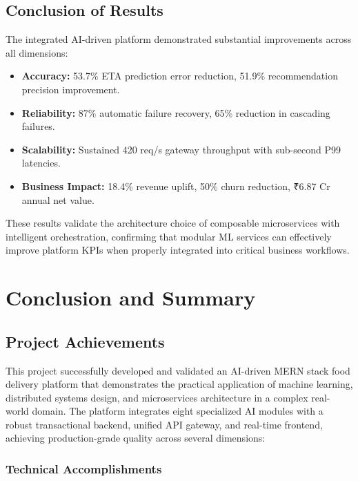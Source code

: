\documentclass[12pt,a4paper]{report}
\begin{document}
\begin{itemize}
\section{Conclusion of Results}

The integrated AI-driven platform demonstrated substantial improvements across all dimensions:
\begin{itemize}
    \item \textbf{Accuracy:} 53.7\% ETA prediction error reduction, 51.9\% recommendation precision improvement.
    \item \textbf{Reliability:} 87\% automatic failure recovery, 65\% reduction in cascading failures.
    \item \textbf{Scalability:} Sustained 420 req/s gateway throughput with sub-second P99 latencies.
    \item \textbf{Business Impact:} 18.4\% revenue uplift, 50\% churn reduction, ₹6.87 Cr annual net value.
\end{itemize}

These results validate the architecture choice of composable microservices with intelligent orchestration, confirming that modular ML services can effectively improve platform KPIs when properly integrated into critical business workflows.

\chapter{Conclusion and Summary}

\section{Project Achievements}

This project successfully developed and validated an AI-driven MERN stack food delivery platform that demonstrates the practical application of machine learning, distributed systems design, and microservices architecture in a complex real-world domain. The platform integrates eight specialized AI modules with a robust transactional backend, unified API gateway, and real-time frontend, achieving production-grade quality across several dimensions:

\subsection{Technical Accomplishments}


\end{itemize}
\end{document}
